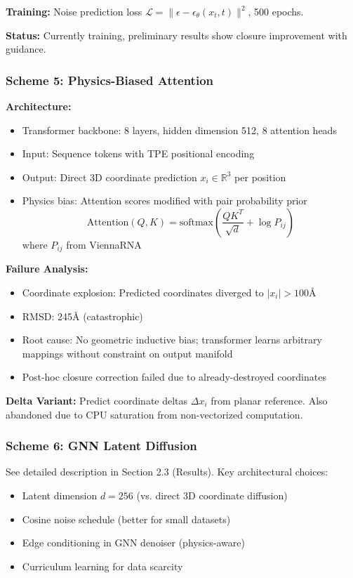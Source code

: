 \documentclass[12pt]{article}
\begin{document}
\textbf{Training:} Noise prediction loss $\mathcal{L} = \|\epsilon - \epsilon_\theta(x_t, t)\|^2$, 500 epochs.

\textbf{Status:} Currently training, preliminary results show closure improvement with guidance.

\subsubsection{Scheme 5: Physics-Biased Attention}

\textbf{Architecture:}
\begin{itemize}
\item Transformer backbone: 8 layers, hidden dimension 512, 8 attention heads
\item Input: Sequence tokens with TPE positional encoding
\item Output: Direct 3D coordinate prediction $x_i \in \mathbb{R}^3$ per position
\item Physics bias: Attention scores modified with pair probability prior
\begin{equation}
\text{Attention}(Q, K) = \text{softmax}\left(\frac{QK^T}{\sqrt{d}} + \log P_{ij}\right)
\end{equation}
where $P_{ij}$ from ViennaRNA
\end{itemize}

\textbf{Failure Analysis:}
\begin{itemize}
\item Coordinate explosion: Predicted coordinates diverged to $|x_i| > 100$Å
\item RMSD: 245Å (catastrophic)
\item Root cause: No geometric inductive bias; transformer learns arbitrary mappings without constraint on output manifold
\item Post-hoc closure correction failed due to already-destroyed coordinates
\end{itemize}

\textbf{Delta Variant:} Predict coordinate deltas $\Delta x_i$ from planar reference. Also abandoned due to CPU saturation from non-vectorized computation.

\subsubsection{Scheme 6: GNN Latent Diffusion}

See detailed description in Section 2.3 (Results). Key architectural choices:
\begin{itemize}
\item Latent dimension $d=256$ (vs. direct 3D coordinate diffusion)
\item Cosine noise schedule (better for small datasets)
\item Edge conditioning in GNN denoiser (physics-aware)
\item Curriculum learning for data scarcity
\end{itemize}
\end{document}
